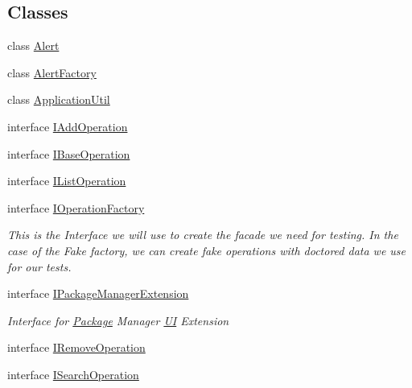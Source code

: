 \subsection*{Classes}
\begin{DoxyCompactItemize}
\item 
class \mbox{\hyperlink{class_unity_editor_1_1_package_manager_1_1_u_i_1_1_alert}{Alert}}
\item 
class \mbox{\hyperlink{class_unity_editor_1_1_package_manager_1_1_u_i_1_1_alert_factory}{Alert\+Factory}}
\item 
class \mbox{\hyperlink{class_unity_editor_1_1_package_manager_1_1_u_i_1_1_application_util}{Application\+Util}}
\item 
interface \mbox{\hyperlink{interface_unity_editor_1_1_package_manager_1_1_u_i_1_1_i_add_operation}{I\+Add\+Operation}}
\item 
interface \mbox{\hyperlink{interface_unity_editor_1_1_package_manager_1_1_u_i_1_1_i_base_operation}{I\+Base\+Operation}}
\item 
interface \mbox{\hyperlink{interface_unity_editor_1_1_package_manager_1_1_u_i_1_1_i_list_operation}{I\+List\+Operation}}
\item 
interface \mbox{\hyperlink{interface_unity_editor_1_1_package_manager_1_1_u_i_1_1_i_operation_factory}{I\+Operation\+Factory}}
\begin{DoxyCompactList}\small\item\em This is the Interface we will use to create the facade we need for testing. In the case of the Fake factory, we can create fake operations with doctored data we use for our tests. \end{DoxyCompactList}\item 
interface \mbox{\hyperlink{interface_unity_editor_1_1_package_manager_1_1_u_i_1_1_i_package_manager_extension}{I\+Package\+Manager\+Extension}}
\begin{DoxyCompactList}\small\item\em Interface for \mbox{\hyperlink{class_unity_editor_1_1_package_manager_1_1_u_i_1_1_package}{Package}} Manager \mbox{\hyperlink{namespace_unity_editor_1_1_package_manager_1_1_u_i}{UI}} Extension \end{DoxyCompactList}\item 
interface \mbox{\hyperlink{interface_unity_editor_1_1_package_manager_1_1_u_i_1_1_i_remove_operation}{I\+Remove\+Operation}}
\item 
interface \mbox{\hyperlink{interface_unity_editor_1_1_package_manager_1_1_u_i_1_1_i_search_operation}{I\+Search\+Operation}}

\end{DoxyCompactItemize}
